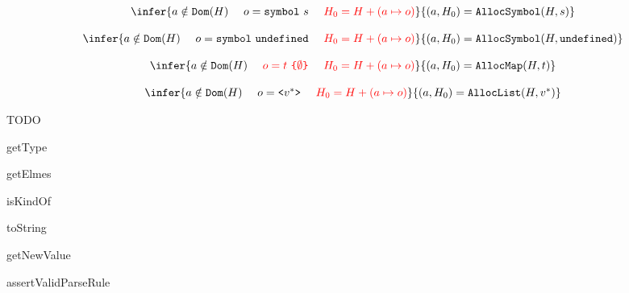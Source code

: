 \[\begin{array}{c}
\infer
{a \notin \code{Dom}(\symheap)\ \ \ \
o = \code{symbol}\ s\ \ \ \
\inred{\symheap_0 = \symheap + (a \mapsto o)}}
{\hallocsym{\symheap}{s}{a}{\symheap_0}}
\\ \\
\infer
{a \notin \code{Dom}(\symheap)\ \ \ \
o = \code{symbol}\ \code{undefined}\ \ \ \
\inred{\symheap_0 = \symheap + (a \mapsto o)}}
{\hallocsym{\symheap}{\code{undefined}}{a}{\symheap_0}}
\\ \\
\infer
{a \notin \code{Dom}(\symheap)\ \ \ \
\inred{o = t\ \code{\{} {\emptyset} \code{\}}}\ \ \ \
\inred{\symheap_0 = \symheap + (a \mapsto o)}}
{\hallocmap{\symheap}{t}{a}{\symheap_0}}
\\ \\
\infer
{a \notin \code{Dom}(\symheap)\ \ \ \
o = \symlist{v^*}\ \ \ \
\inred{\symheap_0 = \symheap + (a \mapsto o)}}
{\halloclist{\symheap}{v^*}{a}{\symheap_0}}
\end{array}\]

TODO

getType

getElmes

isKindOf

toString

getNewValue

assertValidParseRule
